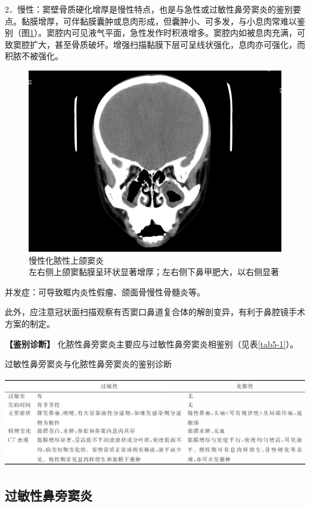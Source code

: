 2．慢性：窦壁骨质硬化增厚是慢性特点，也是与急性或过敏性鼻旁窦炎的鉴别要点。黏膜增厚，可伴黏膜囊肿或息肉形成，但囊肿小、可多发，与小息肉常难以鉴别（图\ref{fig5-4}）。窦腔内可见液气平面，急性发作时积液增多。窦腔内如被息肉充满，可致窦腔扩大，甚至骨质破坏。增强扫描黏膜下层可呈线状强化，息肉亦可强化，而积脓不被强化。

\begin{figure}[!htbp]
 \centering
 \includegraphics[width=.7\textwidth,height=\textheight,keepaspectratio]{./images/Image00125.jpg}
 \captionsetup{justification=centering}
 \caption{慢性化脓性上颌窦炎\\{\small 左右侧上颌窦黏膜呈环状显著增厚；左右侧下鼻甲肥大，以右侧显著}}
 \label{fig5-4}
  \end{figure} 

并发症：可导致眶内炎性假瘤、颌面骨慢性骨髓炎等。

此外，应注意冠状面扫描观察有否窦口鼻道复合体的解剖变异，有利于鼻腔镜手术方案的制定。

\textbf{【鉴别诊断】}
化脓性鼻旁窦炎主要应与过敏性鼻旁窦炎相鉴别（见表\ref{tab5-1}）。

\begin{table}[htbp]
\centering
\caption{过敏性鼻旁窦炎与化脓性鼻旁窦炎的鉴别诊断}
\label{tab5-1}
\includegraphics[width=\textwidth,height=\textheight,keepaspectratio]{./images/Image00126.jpg}
\end{table}

\subsection{过敏性鼻旁窦炎}

